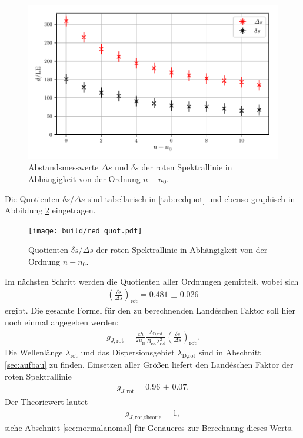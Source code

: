 \begin{figure}[H]
  \centering
  \includegraphics{Zusatzplots/red_ds.pdf}
  \caption{Abstandsmesswerte $\Delta s$ und $\delta s$ der roten Spektrallinie in Abhängigkeit von der Ordnung $n-n_0$.}
  \label{fig:redds}
\end{figure}

Die Quotienten $\delta s/\Delta s$ sind tabellarisch in \ref{tab:redquot} und ebenso
graphisch in Abbildung \ref{fig:redquot} eingetragen.

\begin{figure}[H]
  \centering
  \texttt{[image: build/red\_quot.pdf]}
  \caption{Quotienten $\delta s/\Delta s$ der roten Spektrallinie in Abhängigkeit von der Ordnung $n-n_0$.}
  \label{fig:redquot}
\end{figure}

Im nächsten Schritt werden die Quotienten aller Ordnungen gemittelt, wobei sich
\begin{align}
  \left(\frac{\delta s}{\Delta s}\right)_\text{rot} = \num{0.481(26)}
\end{align}
ergibt. Die gesamte Formel für den zu berechnenden Landéschen Faktor soll hier noch
einmal angegeben werden:
\begin{align}
  g_{J,\text{rot}} = \frac{c h}{2 \mu_\text{B}} \frac{\lambda_\text{D,rot}}{B_\text{rot} \lambda_\text{rot}^2} \left(\frac{\delta s}{\Delta s}\right)_\text{rot}.
\end{align}
Die Wellenlänge $\lambda_\text{rot}$ und das Dispersionsgebiet $\lambda_\text{D,rot}$ sind in Abschnitt \ref{sec:aufbau}
zu finden. Einsetzen aller Größen liefert den Landéschen Faktor der roten Spektrallinie
\begin{align}
  g_{J,\text{rot}} = \num{0.96(7)}.
\end{align}
Der Theoriewert lautet
\begin{align}
  g_{J,\text{rot,theorie}} = 1,
\end{align}
siehe Abschnitt \ref{sec:normalanomal} für Genaueres zur Berechnung dieses Werts.

